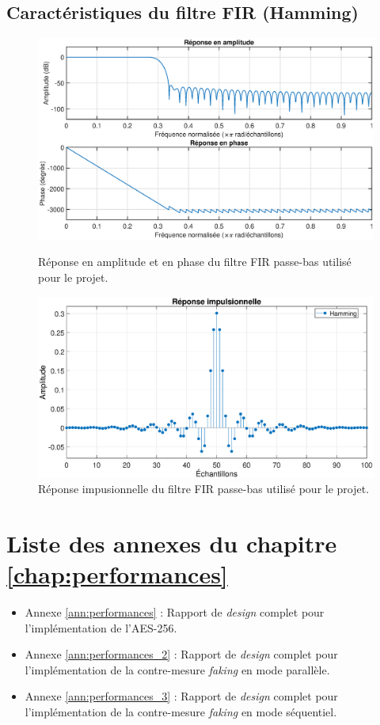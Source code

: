 \documentclass[oneside]{book}
\begin{document}
\begin{appendices}
\section{Caractéristiques du filtre FIR (Hamming)}
\label{ann:hamming}
\begin{figure}[htbp]
    \centering
    \includegraphics[scale=0.48]{image/hamming}
    \caption{Réponse en amplitude et en phase du filtre FIR passe-bas utilisé pour le projet.}
    \label{fig:hamming}
    \vspace{0.4cm}
     \centering
    \includegraphics[scale=0.48]{image/impulse_response}
    \caption{Réponse impusionnelle du filtre FIR passe-bas utilisé pour le projet.}
    \label{fig:impulse_response}
\end{figure}






\chapter{Liste des annexes du chapitre \ref{chap:performances}}
\begin{itemize}
\item Annexe \ref{ann:performances} : Rapport de \textit{design} complet pour l'implémentation de l'AES-256.
\item Annexe \ref{ann:performances_2} : Rapport de \textit{design} complet pour l'implémentation de la contre-mesure \textit{faking} en mode parallèle.
\item Annexe \ref{ann:performances_3} : Rapport de \textit{design} complet pour l'implémentation de la contre-mesure \textit{faking} en mode séquentiel.
\end{itemize}


\end{appendices}
\end{document}
